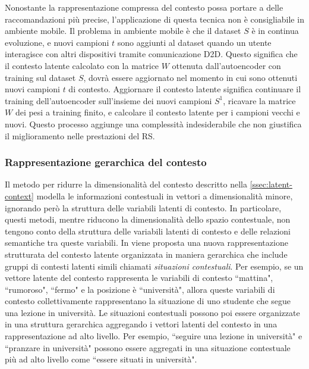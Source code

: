 Nonostante la rappresentazione compressa del contesto possa portare a delle raccomandazioni più precise, l'applicazione di questa tecnica non è consigliabile in ambiente mobile. Il problema in ambiente mobile è che il dataset $S$ è in continua evoluzione, e nuovi campioni $t$ sono aggiunti al dataset quando un utente interagisce con altri dispositivi tramite comunicazione D2D. Questo significa che il contesto latente calcolato con la matrice $W$ ottenuta dall'autoencoder con training sul dataset $S$, dovrà essere aggiornato nel momento in cui sono ottenuti nuovi campioni $t$ di contesto. Aggiornare il contesto latente significa continuare il training dell'autoencoder sull'insieme dei nuovi campioni $S^1$, ricavare la matrice $W$ dei pesi a training finito, e calcolare il contesto latente per i campioni vecchi e nuovi. Questo processo aggiunge una complessità indesiderabile che non giustifica il miglioramento nelle prestazioni del RS.

\subsubsection{Rappresentazione gerarchica del contesto}
\label{ssec:hierarchical}
Il metodo per ridurre la dimensionalità del contesto descritto nella \autoref{ssec:latent-context} modella le informazioni contestuali in vettori a dimensionalità minore, ignorando però la struttura delle variabili latenti di contesto. In particolare, questi metodi, mentre riducono la dimensionalità dello spazio contestuale, non tengono conto della struttura delle variabili latenti di contesto e delle relazioni semantiche tra queste variabili. In \cite{hierarchical-context} viene proposta una nuova rappresentazione strutturata del contesto latente organizzata in maniera gerarchica che include gruppi di contesti latenti simili chiamati \textit{situazioni contestuali}. Per esempio, se un vettore latente del contesto rappresenta le variabili di contesto ``mattina", ``rumoroso", ``fermo" e la posizione è ``università", allora queste variabili di contesto collettivamente rappresentano la situazione di uno studente che segue una lezione in università. Le situazioni contestuali possono poi essere organizzate in una struttura gerarchica aggregando i vettori latenti del contesto in una rappresentazione ad alto livello. Per esempio, ``seguire una lezione in università" e ``pranzare in università" possono essere aggregati in una situazione contestuale più ad alto livello come ``essere situati in università".

